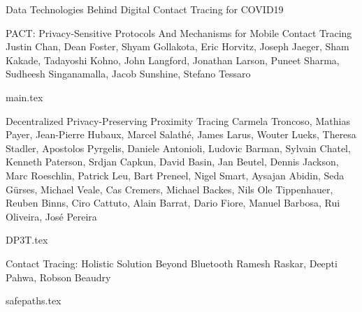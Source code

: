 \documentclass[11pt]{article}
\begin{document}
\begin{bulletin}
\begin{articlesection}{Data Technologies Behind Digital Contact Tracing for COVID19}
%
%
%




\makeatletter
\renewcommand{\AB@affillist}{}
\renewcommand{\AB@authlist}{}
\setcounter{authors}{0}
\makeatother

\begin{article}
{{PACT}:   Privacy-Sensitive Protocols And Mechanisms for Mobile Contact Tracing}
{Justin Chan, Dean Foster, Shyam Gollakota, Eric Horvitz,  Joseph Jaeger, Sham Kakade, Tadayoshi Kohno, 
John Langford, Jonathan Larson, Puneet Sharma, Sudheesh Singanamalla,
Jacob Sunshine, Stefano Tessaro}
\graphicspath{{submissions/pact/}}
{main.tex}
\end{article}


\makeatletter
\renewcommand{\AB@affillist}{}
\renewcommand{\AB@authlist}{}
\setcounter{authors}{0}
\makeatother

\begin{article}
{Decentralized Privacy-Preserving Proximity Tracing}
{Carmela Troncoso, 
Mathias Payer, 
Jean-Pierre Hubaux, 
Marcel Salath\'e, 
James Larus, 
Wouter Lueks, 
Theresa Stadler,
Apostolos Pyrgelis,
Daniele Antonioli,
Ludovic Barman,
Sylvain Chatel,
Kenneth Paterson,
Srdjan Capkun, 
David Basin,
Jan Beutel,
Dennis Jackson,
Marc Roeschlin,
Patrick Leu,
Bart Preneel,
Nigel Smart,
Aysajan Abidin,
Seda G\"urses,
Michael Veale,
Cas Cremers,
Michael Backes,
Nils Ole Tippenhauer,
Reuben Binns,
Ciro Cattuto,
Alain Barrat,
Dario Fiore,
Manuel Barbosa,
Rui Oliveira,
Jos\'e Pereira}
\graphicspath{{submissions/dp3t/}}
{DP3T.tex}
\end{article}


\makeatletter
\renewcommand{\AB@affillist}{}
\renewcommand{\AB@authlist}{}
\setcounter{authors}{0}
\makeatother


\begin{article}
{Contact Tracing: Holistic Solution Beyond Bluetooth}
{Ramesh Raskar, Deepti Pahwa, Robson Beaudry }
\graphicspath{{submissions/safepaths/}}
{safepaths.tex}
\end{article}



\end{articlesection}
\end{bulletin}
\end{document}
